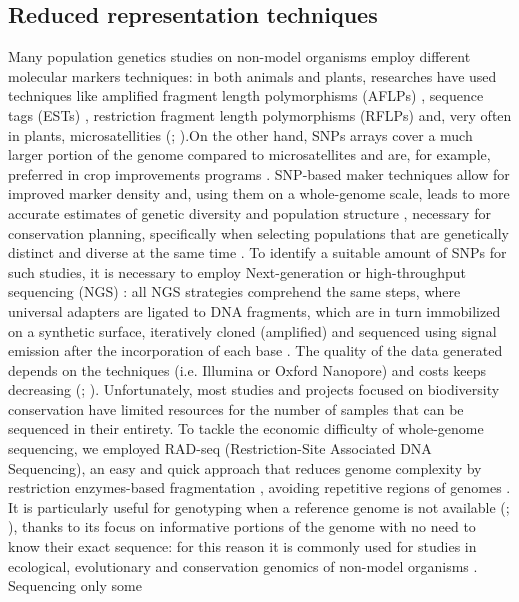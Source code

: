 \documentclass[a4paper, 12pt]{report}
\begin{document}
\subsection{Reduced representation techniques}
Many population genetics studies on non-model organisms employ different molecular markers techniques: in both animals and plants, researches have used techniques like amplified fragment length polymorphisms (AFLPs) \parencite{whitlockConsequencesInsituStrategies2016}, sequence tags (ESTs) \parencite{suppleConservationBiodiversityGenomics2018}, restriction fragment length polymorphisms (RFLPs) \parencite{heGenotypingbysequencingGBSUltimate2014}and, very often in plants, microsatellities (\cite{aegisdottirIsolatedPopulationsRare2009}; \cite{mandolinoMOLECULARFINGERPRINTINGTRADITIONAL2015}).On the other hand, SNPs arrays cover a much larger portion of the genome compared to microsatellites and are, for example, preferred in crop improvements programs \parencite{salgotraGeneticDiversityConservation2023}. SNP-based maker techniques allow for improved marker density \parencite{heGenotypingbysequencingGBSUltimate2014}and, using them on a whole-genome scale, leads to more accurate estimates of genetic diversity and population structure \parencite{suppleConservationBiodiversityGenomics2018}, necessary for conservation planning, specifically when selecting populations that are genetically distinct and diverse at the same time \parencite{yinPlantConservationAge2024}. To identify a suitable amount of SNPs for such studies, it is necessary to employ Next-generation or high-throughput sequencing (NGS) \parencite{sonahImprovedGenotypingSequencing2013}: all NGS strategies comprehend the same steps, where universal adapters are ligated to DNA fragments, which are in turn immobilized on a synthetic surface, iteratively cloned  (amplified) and sequenced using signal emission after the incorporation of each base \parencite{heGenotypingbysequencingGBSUltimate2014}. The quality of the data generated depends on the techniques (i.e. Illumina or Oxford Nanopore) and costs keeps decreasing (\cite{heGenotypingbysequencingGBSUltimate2014}; \cite{yinPlantConservationAge2024}). Unfortunately, most studies and projects focused on biodiversity conservation have limited resources \parencite{suppleConservationBiodiversityGenomics2018} for the number of samples that can be sequenced in their entirety. To tackle the economic difficulty of whole-genome sequencing, we employed RAD-seq (Restriction-Site Associated DNA Sequencing), an easy and quick approach that reduces genome complexity by restriction enzymes-based fragmentation  \parencite{elshireRobustSimpleGenotypingbySequencing2011}, avoiding repetitive regions of genomes \parencite{elshireRobustSimpleGenotypingbySequencing2011}.  It is particularly useful for genotyping when a reference genome is not available (\cite{elshireRobustSimpleGenotypingbySequencing2011}; \cite{heGenotypingbysequencingGBSUltimate2014}), thanks to its focus on informative portions of the genome with no need to know their exact sequence: for this reason it is commonly used for studies in ecological, evolutionary and conservation genomics of non-model organisms \parencite{andrewsHarnessingPowerRADseq2016}. Sequencing only some 
\end{document}
